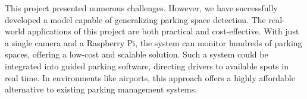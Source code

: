 \documentclass[12pt, letterpaper, oneside]{article}
\begin{document}
This project presented numerous challenges. However, we have successfully developed a model capable of generalizing parking space detection. The real-world applications of this project are both practical and cost-effective. With just a single camera and a Raspberry Pi, the system can monitor hundreds of parking spaces, offering a low-cost and scalable solution. Such a system could be integrated into guided parking software, directing drivers to available spots in real time. In environments like airports, this approach offers a highly affordable alternative to existing parking management systems.





\cite{pklotdataset2013}



\end{document}
